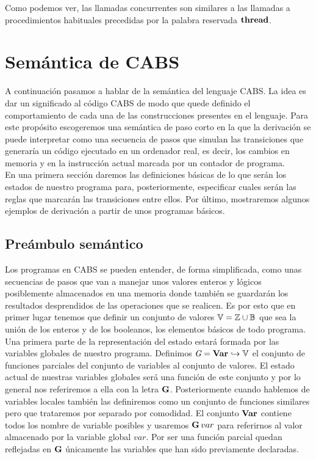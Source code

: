 
Como podemos ver, las llamadas concurrentes son similares a las llamadas a procedimientos habituales precedidas por la palabra reservada $\textbf{thread}$.

\section{Semántica de CABS}
A continuación pasamos a hablar de la semántica del lenguaje CABS. La idea es dar un significado al código CABS de modo que quede definido el comportamiento de cada una de las construcciones presentes en el lenguaje. Para este propósito escogeremos una semántica de paso corto en la que la derivación se puede interpretar como una secuencia de pasos que simulan las transiciones que generaría un código ejecutado en un ordenador real, es decir, los cambios en memoria y en la instrucción actual marcada por un contador de programa.\\

En una primera sección daremos las definiciones básicas de lo que serán los estados de nuestro programa para, posteriormente, especificar cuales serán las reglas que marcarán las transiciones entre ellos. Por último, mostraremos algunos ejemplos de derivación a partir de unos programas básicos.

\subsection{Preámbulo semántico}
Los programas en CABS se pueden entender, de forma simplificada, como unas secuencias de pasos que van a manejar unos valores enteros y lógicos posiblemente almacenados en una memoria donde también se guardarán los resultados desprendidos de las operaciones que se realicen. Es por esto que en primer lugar tenemos que definir un conjunto de valores $\mathbb{V} = \mathbb{Z} \cup \mathbb{B}$ que sea la unión de los enteros y de los booleanos, los elementos básicos de todo programa.\\

Una primera parte de la representación del estado estará formada por las variables globales de nuestro programa. Definimos $\textit{G} = \textbf{Var} \hookrightarrow \mathbb{V}$ el conjunto de funciones parciales del conjunto de variables al conjunto de valores. El estado actual de nuestras variables globales será una función de este conjunto y por lo general nos referiremos a ella con la letra $\mathbf{G}$. Posteriormente cuando hablemos de variables locales también las definiremos como un conjunto de funciones similares pero que trataremos por separado por comodidad. El conjunto $\textbf{Var}$ contiene todos los nombre de variable posibles y usaremos $\mathbf{G}\,var$ para referirnos al valor almacenado por la variable global $var$. Por ser una función parcial quedan reflejadas en $\mathbf{G}$ únicamente las variables que han sido previamente declaradas.\\

